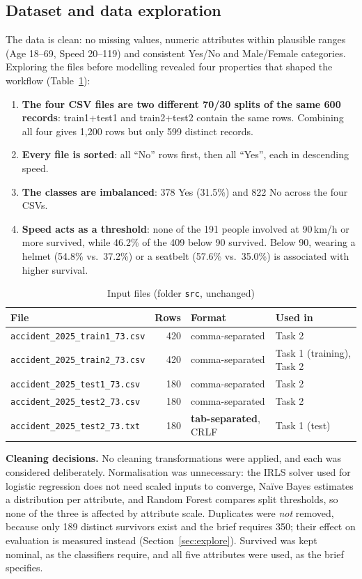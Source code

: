 \documentclass[11pt,a4paper]{article}
\newcommand{\cd}[1]{\texttt{#1}}
\begin{document}
\subsection{Dataset and data exploration}
The data is clean: no missing values, numeric attributes within plausible ranges (Age 18--69, Speed 20--119) and
consistent Yes/No and Male/Female categories. Exploring the files before modelling revealed four properties that
shaped the workflow (Table~\ref{tab:files}):
\begin{enumerate}
  \item \textbf{The four CSV files are two different 70/30 splits of the same 600 records}: train1+test1 and
        train2+test2 contain the same rows. Combining all four gives 1,200 rows but only 599 distinct records.
  \item \textbf{Every file is sorted}: all ``No'' rows first, then all ``Yes'', each in descending speed.
  \item \textbf{The classes are imbalanced}: 378 Yes (31.5\%) and 822 No across the four CSVs.
  \item \textbf{Speed acts as a threshold}: none of the 191 people involved at 90\,km/h or more survived, while 46.2\%
        of the 409 below 90 survived. Below 90, wearing a helmet (54.8\% vs.\ 37.2\%) or a seatbelt (57.6\% vs.\
        35.0\%) is associated with higher survival.
\end{enumerate}

\begin{table}[H]\centering\small
\caption{Input files (folder \cd{src}, unchanged)}\label{tab:files}
\begin{tabular}{@{}lrll@{}}\toprule
File & Rows & Format & Used in \\ \midrule
\cd{accident\_2025\_train1\_73.csv} & 420 & comma-separated & Task 2 \\
\cd{accident\_2025\_train2\_73.csv} & 420 & comma-separated & Task 1 (training), Task 2 \\
\cd{accident\_2025\_test1\_73.csv}  & 180 & comma-separated & Task 2 \\
\cd{accident\_2025\_test2\_73.csv}  & 180 & comma-separated & Task 2 \\
\cd{accident\_2025\_test2\_73.txt}  & 180 & \textbf{tab-separated}, CRLF & Task 1 (test) \\ \bottomrule
\end{tabular}
\end{table}

\textbf{Cleaning decisions.} No cleaning transformations were applied, and each was considered deliberately.
Normalisation was unnecessary: the IRLS solver used for logistic regression does not need scaled inputs to converge,
Naïve Bayes estimates a distribution per attribute, and Random Forest compares split thresholds, so none of the three
is affected by attribute scale. Duplicates were \emph{not} removed, because only 189 distinct survivors exist and the
brief requires 350; their effect on evaluation is measured instead (Section~\ref{sec:explore}). Survived was kept
nominal, as the classifiers require, and all five attributes were used, as the brief specifies.
\end{document}
